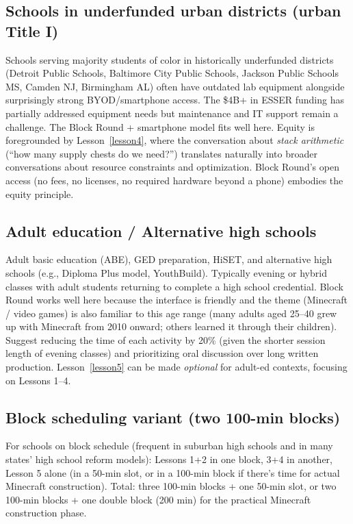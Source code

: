 \documentclass[12pt,a4paper]{scrartcl}
\begin{document}
\subsection{Schools in underfunded urban districts (urban Title I)}
Schools serving majority students of color in historically underfunded districts (Detroit Public Schools, Baltimore City Public Schools, Jackson Public Schools MS, Camden NJ, Birmingham AL) often have outdated lab equipment alongside surprisingly strong BYOD/smartphone access. The \$4B+ in ESSER funding has partially addressed equipment needs but maintenance and IT support remain a challenge. The Block Round + smartphone model fits well here. Equity is foregrounded by Lesson~\ref{lesson4}, where the conversation about \emph{stack arithmetic} (\enquote{how many supply chests do we need?}) translates naturally into broader conversations about resource constraints and optimization. Block Round's open access (no fees, no licenses, no required hardware beyond a phone) embodies the equity principle.

\subsection{Adult education / Alternative high schools}
Adult basic education (ABE), GED preparation, HiSET, and alternative high schools (e.g., Diploma Plus model, YouthBuild). Typically evening or hybrid classes with adult students returning to complete a high school credential. Block Round works well here because the interface is friendly and the theme (Minecraft / video games) is also familiar to this age range (many adults aged 25--40 grew up with Minecraft from 2010 onward; others learned it through their children). Suggest reducing the time of each activity by 20\% (given the shorter session length of evening classes) and prioritizing oral discussion over long written production. Lesson~\ref{lesson5} can be made \emph{optional} for adult-ed contexts, focusing on Lessons 1--4.

\subsection{Block scheduling variant (two 100-min blocks)}
For schools on block schedule (frequent in suburban high schools and in many states' high school reform models): Lessons 1+2 in one block, 3+4 in another, Lesson 5 alone (in a 50-min slot, or in a 100-min block if there's time for actual Minecraft construction). Total: three 100-min blocks + one 50-min slot, or two 100-min blocks + one double block (200 min) for the practical Minecraft construction phase.
\end{document}
